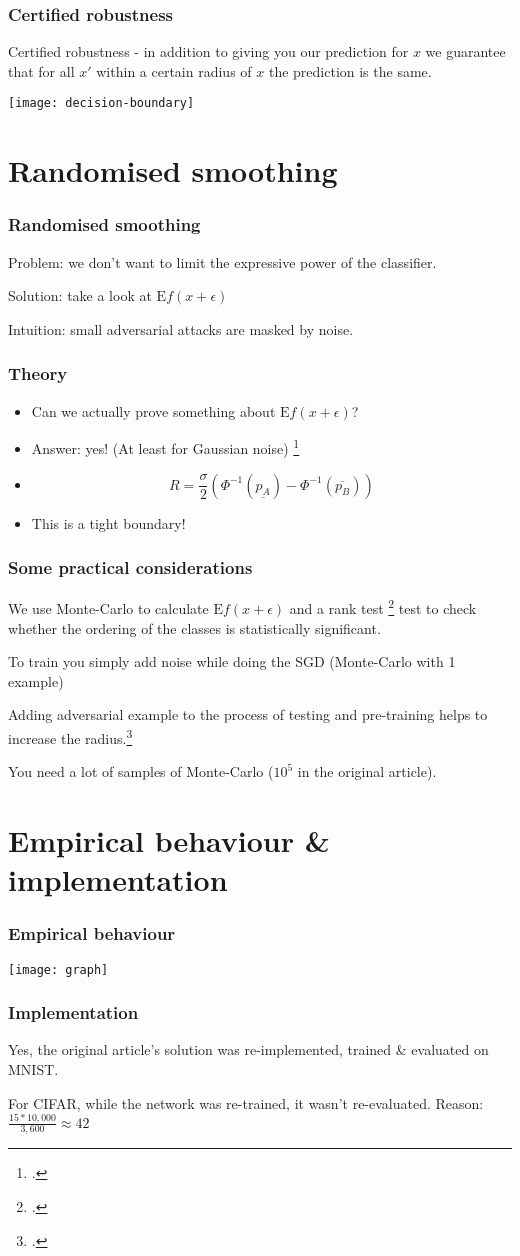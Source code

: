 \documentclass{beamer}
\begin{document}
\frame
{
	\frametitle{Certified robustness}
	Certified robustness - in addition to giving you our prediction for $x$ we guarantee that for all $x'$ within a certain radius of $x$ the prediction is the same.
	\begin{center}
  \texttt{[image: decision-boundary]}
  \end{center}

}

\section{Randomised smoothing}
\frame
{
\frametitle{Randomised smoothing}
Problem: we don't want to limit the expressive power of the classifier.

Solution: take a look at $\text{E}f(x + \epsilon)$

Intuition: small adversarial attacks are masked by noise.

}

\frame
{
\frametitle{Theory}

\begin{itemize}[<+->]
\item[] Can we actually prove something about $\text{E}f(x + \epsilon)$?

\item[] Answer: yes! (At least for Gaussian noise) \footcite{cohen2019certified, salman2020provably}

\item[] \[R = \frac{\sigma}{2}(\Phi^{-1}(\underline{p_A})-\Phi^{-1}(\overline{p_B}))\]

\item[] This is a tight boundary!

\end{itemize}
}

\frame
{
\frametitle{Some practical considerations}

We use Monte-Carlo to calculate $\text{E}f(x + \epsilon)$ and a rank test \footcite{hung2019} test to check whether the ordering of the classes is statistically significant.

To train you simply add noise while doing the SGD (Monte-Carlo with 1 example)

Adding adversarial example to the process of testing and pre-training helps to increase the radius.\footcite{salman2020provably}

You need a lot of samples of Monte-Carlo ($10^5$ in the original article).
}

\section{Empirical behaviour \& implementation}

\frame
{
\frametitle{Empirical behaviour}
	\begin{center}
  \texttt{[image: graph]}
  \end{center}
}

\frame
{
     \frametitle{Implementation}
     Yes, the original article's solution was re-implemented, trained \& evaluated on MNIST.
     
     For CIFAR, while the network was re-trained, it wasn't re-evaluated. Reason: $\frac{15 * 10,000}{3,600} \approx 42$
}
\end{document}
